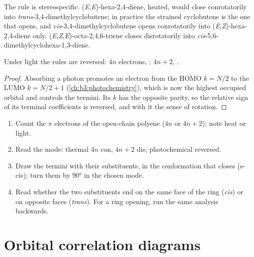 The rule is stereospecific. (\textit{E},\textit{E})-hexa-2,4-diene, heated, would close
conrotatorily into \textit{trans}-3,4-dimethylcyclobutene; in practice the strained
cyclobutene is the one that opens, and \textit{cis}-3,4-dimethylcyclobutene opens
conrotatorily into (\textit{E},\textit{Z})-hexa-2,4-diene only. (\textit{E},\textit{Z},\textit{E})-octa-2,4,6-triene closes
disrotatorily into \textit{cis}-5,6-dimethylcyclohexa-1,3-diene.

\begin{proposition}\label{prop:b3:pericyclic:photo-electrocyclic}
Under light the rules are reversed: $4n$ electrons, ; $4n + 2$, .
\end{proposition}

\begin{proof}
Absorbing a photon promotes an electron from the HOMO $k = N/2$ to the LUMO $k = N/2 + 1$
(\cref{ch:b3:photochemistry}), which is now the highest occupied orbital and
controls the termini. Its $k$ has the opposite parity, so the relative sign of its
terminal coefficients is reversed, and with it the sense of rotation.
\end{proof}

\begin{method}\label{met:b3:pericyclic:predict-stereo}
\begin{enumerate}
  \item Count the $\pi$ electrons of the open-chain polyene ($4n$ or $4n + 2$); note heat or
        light.
  \item Read the mode: thermal $4n$ con, $4n + 2$ dis; photochemical reversed.
  \item Draw the termini with their substituents, in the conformation that
        closes (s-cis); turn them by 90° in the chosen mode.
  \item Read whether the two substituents end on the same face of the ring
        (\textit{cis}) or on opposite faces (\textit{trans}). For a ring opening, run the same
        analysis backwards.
\end{enumerate}
\end{method}

\section{Orbital correlation diagrams}

